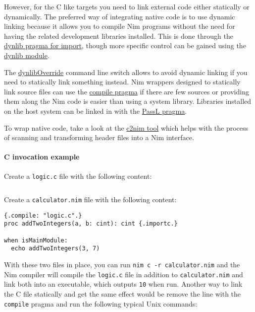 However, for the C like targets you need to link external code either
statically or dynamically. The preferred way of integrating native code
is to use dynamic linking because it allows you to compile Nim programs
without the need for having the related development libraries installed.
This is done through the
\href{manual.html\#foreign-function-interface-dynlib-pragma-for-import}{dynlib
pragma for import}, though more specific control can be gained using the
\href{dynlib.html}{dynlib module}.

The \href{nimc.html\#dynliboverride}{dynlibOverride} command line switch
allows to avoid dynamic linking if you need to statically link something
instead. Nim wrappers designed to statically link source files can use
the
\href{manual.html\#implementation-specific-pragmas-compile-pragma}{compile
pragma} if there are few sources or providing them along the Nim code is
easier than using a system library. Libraries installed on the host
system can be linked in with the
\href{manual.html\#implementation-specific-pragmas-passl-pragma}{PassL
pragma}.

To wrap native code, take a look at the
\href{https://github.com/nim-lang/c2nim/blob/master/doc/c2nim.rst}{c2nim
tool} which helps with the process of scanning and transforming header
files into a Nim interface.

\hypertarget{c-invocation-example}{%
\paragraph{C invocation example}\label{c-invocation-example}}

Create a \texttt{logic.c} file with the following content:

\begin{verbatim}
\end{verbatim}

Create a \texttt{calculator.nim} file with the following content:

\begin{verbatim}
{.compile: "logic.c".}
proc addTwoIntegers(a, b: cint): cint {.importc.}

when isMainModule:
  echo addTwoIntegers(3, 7)
\end{verbatim}

With these two files in place, you can run
\texttt{nim\ c\ -r\ calculator.nim} and the Nim compiler will compile
the \texttt{logic.c} file in addition to \texttt{calculator.nim} and
link both into an executable, which outputs \texttt{10} when run.
Another way to link the C file statically and get the same effect would
be remove the line with the \texttt{compile} pragma and run the
following typical Unix commands:

